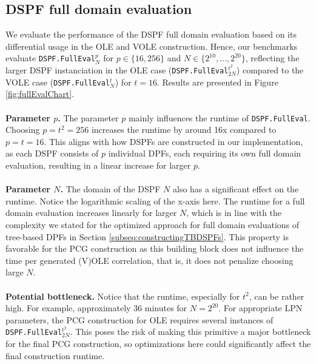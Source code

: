 \subsection{DSPF full domain evaluation}
\label{subsec:evalDspfFullDomain}
We evaluate the performance of the DSPF full domain evaluation based on its differential usage in the OLE and VOLE construction. Hence, our benchmarks evaluate \texttt{DSPF.FullEval}$_N^p$ for $p\in\{16,256\}$ and $N\in\{2^{10}, ..., 2^{20}\}$, reflecting the larger DSPF instanciation in the OLE case (\texttt{DSPF.FullEval}$_{2N}^{t^2}$) compared to the VOLE case (\texttt{DSPF.FullEval}$_{N}^{t}$) for $t=16$. Results are presented in Figure \ref{fig:fullEvalChart}.
\\\\
\textbf{Parameter $p$.} The parameter $p$ mainly influences the runtime of \texttt{DSPF.FullEval}. Choosing $p=t^2=256$ increases the runtime by around 16x compared to $p=t=16$. This aligns with how DSPFs are constructed in our implementation, as each DSPF consists of $p$ individual DPFs, each requiring its own full domain evaluation, resulting in a linear increase for larger $p$.
\\\\
\textbf{Parameter $N$.} The domain of the DSPF $N$ also has a significant effect on the runtime. Notice the logarithmic scaling of the x-axis here. The runtime for a full domain evaluation increases linearly for larger $N$, which is in line with the complexity we stated for the optimized approach for full domain evaluations of tree-based DPFs in Section \ref{subseq:constructingTBDSPFs}. This property is favorable for the PCG construction as this building block does not influence the time per generated (V)OLE correlation, that is, it does not penalize choosing large $N$.
\\\\
\textbf{Potential bottleneck.} Notice that the runtime, especially for $t^2$, can be rather high. For example, approximately 36 minutes for $N=2^{20}$. For appropriate LPN parameters, the PCG construction for OLE requires several instances of \texttt{DSPF.FullEval}$_{2N}^{t^2}$. This poses the risk of making this primitive a major bottleneck for the final PCG construction, so optimizations here could significantly affect the final construction runtime.
\\\\
